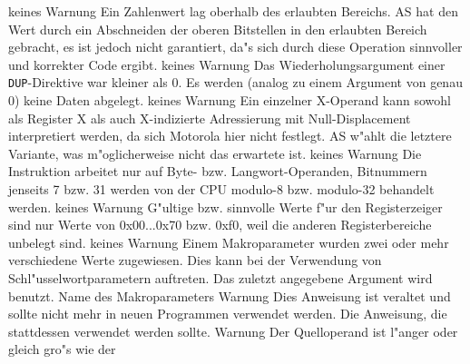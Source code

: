 \documentclass[12pt,a4paper,twoside]{report}
\newcommand{\tty}[1]{{\tt #1}}
\begin{document}
\begin{description}
               {keines}
               {Warnung}
               {Ein Zahlenwert lag oberhalb des erlaubten Bereichs.  AS
                hat den Wert durch ein Abschneiden der oberen Bitstellen
                in den erlaubten Bereich gebracht, es ist jedoch nicht
                garantiert, da"s sich durch diese Operation sinnvoller und
                korrekter Code ergibt.}
               {keines}
               {Warnung}
               {Das Wiederholungsargument einer \tty{DUP}-Direktive war
                kleiner als 0.  Es werden (analog zu einem Argument von
                genau 0) keine Daten abgelegt.}
               {keines}
               {Warnung}
               {Ein einzelner X-Operand kann sowohl als Register X als
                auch X-indizierte Adressierung mit Null-Displacement
                interpretiert werden, da sich Motorola hier nicht festlegt.
                AS w"ahlt die letztere Variante, was m"oglicherweise nicht
                das erwartete ist.}
               {keines}
               {Warnung}
               {Die Instruktion arbeitet nur auf Byte- bzw.
                Langwort-Operanden, Bitnummern jenseits 7 bzw. 31 werden
                von der CPU modulo-8 bzw. modulo-32 behandelt werden.}
               {keines}
               {Warnung}
               {G"ultige bzw. sinnvolle Werte f"ur den Registerzeiger sind
                nur Werte von 0x00...0x70 bzw. 0xf0, weil die anderen
                Registerbereiche unbelegt sind.}
               {keines}
               {Warnung}
               {Einem Makroparameter wurden zwei oder mehr
                verschiedene Werte zugewiesen.  Dies kann bei der
                Verwendung von Schl"usselwortparametern auftreten.
                Das zuletzt angegebene Argument wird benutzt.}
               {Name des Makroparameters}
               {Warnung}
               {Dies Anweisung ist veraltet und sollte nicht mehr
                in neuen Programmen verwendet werden.}
               {Die Anweisung, die stattdessen verwendet werden sollte.}
               {Warnung}
               {Der Quelloperand ist l"anger oder gleich gro"s wie der
}
\end{description}
\end{document}
